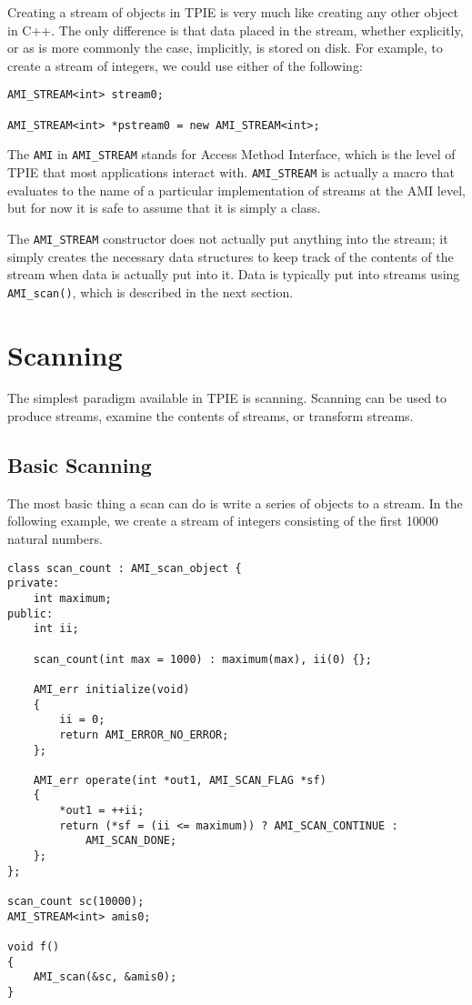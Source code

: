 Creating a stream of objects in TPIE is very much like creating any other
object in C++.  The only difference is that data placed in the stream,
whether explicitly, or as is more commonly the case, implicitly, is
stored on disk.  For example, to create a stream of integers, we could
use either of the following:
\begin{verbatim}
AMI_STREAM<int> stream0;

AMI_STREAM<int> *pstream0 = new AMI_STREAM<int>;
\end{verbatim}

The {\tt AMI} in {\tt AMI\_STREAM} stands for Access Method
Interface, which is the level of TPIE
that most applications interact with.  
{\tt AMI\_STREAM} is actually a macro that evaluates to the name of a
particular implementation of streams at the AMI level, but for now it
is safe to assume that it is simply a class.

The {\tt AMI\_STREAM} constructor does not actually put anything into
the stream; it simply creates the necessary data structures to keep
track of the contents of the stream when data is actually put into it.
Data is typically put into streams using \verb|AMI_scan()|, which is
described in the next section.

\section{Scanning}
\label{sec:scanning}

 
The simplest paradigm available in TPIE is scanning.  Scanning can be
used to produce streams, examine the contents of streams, or transform
streams.  

\subsection{Basic Scanning}

The most basic thing a scan can do is write a series of objects to a
stream.  In the following example, we create a stream of integers
consisting of the first 10000 natural numbers.

\begin{verbatim}
class scan_count : AMI_scan_object {
private:
    int maximum;
public:
    int ii;

    scan_count(int max = 1000) : maximum(max), ii(0) {};

    AMI_err initialize(void) 
    {
        ii = 0;
        return AMI_ERROR_NO_ERROR;
    };

    AMI_err operate(int *out1, AMI_SCAN_FLAG *sf)
    {
        *out1 = ++ii;
        return (*sf = (ii <= maximum)) ? AMI_SCAN_CONTINUE : 
            AMI_SCAN_DONE;
    };
};

scan_count sc(10000);
AMI_STREAM<int> amis0;    

void f()
{
    AMI_scan(&sc, &amis0);
}
\end{verbatim}

